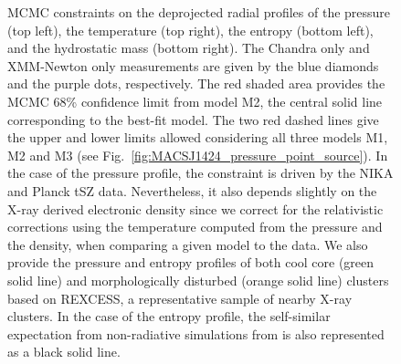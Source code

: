 \documentclass[twocolumn,traditabstract]{aa}
\begin{document}
\begin{figure}[h]
\caption{MCMC constraints on the deprojected radial profiles of the pressure (top left), the temperature (top right), the entropy (bottom left), and the hydrostatic mass (bottom right). The Chandra only and XMM-Newton only measurements are given by the blue diamonds and the purple dots, respectively. The red shaded area provides the MCMC 68\% confidence limit from model M2, the central solid line corresponding to the best-fit model. The two red dashed lines give the upper and lower limits allowed considering all three models M1, M2 and M3 (see Fig.~\ref{fig:MACSJ1424_pressure_point_source}). In the case of the pressure profile, the constraint is driven by the NIKA and Planck tSZ data. Nevertheless, it also depends slightly on the X-ray derived electronic density since we correct for the relativistic corrections using the temperature computed from the pressure and the density, when comparing a given model to the data. We also provide the pressure \citep{arnaud2010} and entropy \citep{pratt2010} profiles of both cool core (green solid line) and morphologically disturbed (orange solid line) clusters based on REXCESS, a representative sample of nearby X-ray clusters. In the case of the entropy profile, the self-similar expectation from non-radiative simulations from \cite{voit2005b} is also represented as a black solid line.}
\label{fig:MACSJ1424_MCMC_tk_profile}
\end{figure}
\end{document}
